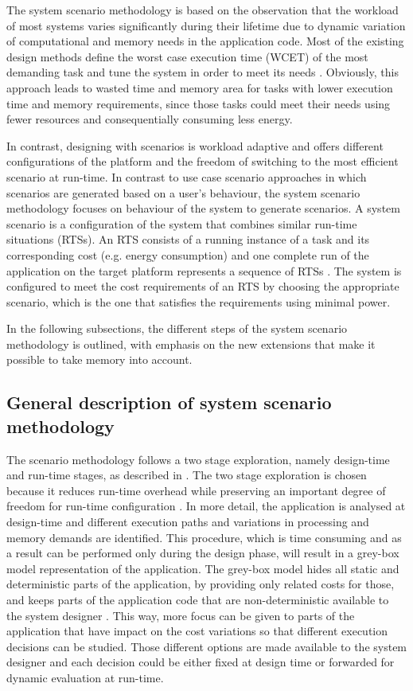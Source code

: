 The system scenario methodology is based on the observation that the workload of most systems varies significantly during their lifetime due to dynamic variation of computational and memory needs in the application code. Most of the existing design methods define the worst case execution time (WCET) of the most demanding task and tune the system in order to meet its needs \cite{tcm}. Obviously, this approach leads to wasted time and memory area for tasks with lower execution time and memory requirements, since those tasks could meet their needs using fewer resources and consequentially consuming less energy. 

In contrast, designing with scenarios is workload adaptive and offers different configurations of the platform and the freedom of switching to the most efficient scenario at run-time. In contrast to use case scenario approaches in which scenarios are generated based on a user's behaviour, the system scenario methodology focuses on behaviour of the system to generate scenarios. A system scenario is a configuration of the system that combines similar run-time situations (RTSs). An RTS consists of a running instance of a task and its corresponding cost (e.g. energy consumption) and one complete run of the application on the target platform represents a sequence of RTSs \cite{Elena2010}. The system is configured to meet the cost requirements of an RTS by choosing the appropriate scenario, which is the one that satisfies the requirements using minimal power.

In the following subsections, the different steps of the system scenario methodology is outlined, with emphasis on the new extensions that make it possible to take memory into account. 

\subsection{General description of system scenario methodology}

The scenario methodology follows a two stage exploration, namely design-time and run-time stages, as described in \cite{Gheorghita2007}. The two stage exploration is chosen because it reduces run-time overhead while preserving an important degree of freedom for run-time configuration \cite{tcm}. In more detail, the application is analysed at design-time and different execution paths and variations in processing and memory demands are identified. This procedure, which is time consuming and as a result can be performed only during the design phase, will result in a grey-box model representation of the application. The grey-box model hides all static and deterministic parts of the application, by providing only related costs for those, and keeps parts of the application code that are non-deterministic available to the system designer \cite{graybox}. This way, more focus can be given to parts of the application that have impact on the cost variations so that different execution decisions can be studied. Those different options are made available to the system designer and each decision could be either fixed at design time or forwarded for dynamic evaluation at run-time.


